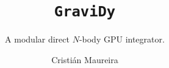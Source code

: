 \documentclass{beamer}
\author[C. Maureira]
       {\large Cristián Maureira\\
        \gray{\url{cmaureir@csrg.cl}}}
\title[GraviDy]
      {\huge \texttt{GraviDy}}
\subtitle{\large A modular direct $N$-body GPU integrator.}
\institute[AEI]
          {Albert Einstein Institute}
\begin{document}


\begin{frame}[t,plain]
    \titlepage
\end{frame}





%
%

\begin{frame}[t,plain]
\titlepage
\end{frame}

\begin{frame}[fragile]
\scriptsize

\end{frame}
\end{document}
